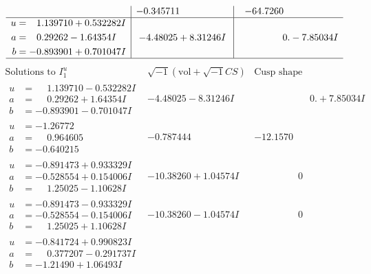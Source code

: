 \documentclass[1p]{elsarticle_modified}
\theoremstyle{definition}
\newcommand{\I}{\sqrt{-1}}
\begin{document}
$$\begin{array}{c|c|c}
 & -0.345711\phantom{ +0.000000I} & -64.7260\phantom{ +0.000000I} \\ \hline\begin{aligned}
u &= \phantom{-}1.139710 + 0.532282 I \\
a &= \phantom{-}0.29262 - 1.64354 I \\
b &= -0.893901 + 0.701047 I\end{aligned}
 & -4.48025 + 8.31246 I & \phantom{-0.000000 } 0. - 7.85034 I\\
 \hline 
 \end{array}$$\newpage$$\begin{array}{c|c|c}  
\text{Solutions to }I^u_{1}& \I (\text{vol} + \sqrt{-1}CS) & \text{Cusp shape}\\
 \hline 
\begin{aligned}
u &= \phantom{-}1.139710 - 0.532282 I \\
a &= \phantom{-}0.29262 + 1.64354 I \\
b &= -0.893901 - 0.701047 I\end{aligned}
 & -4.48025 - 8.31246 I & \phantom{-0.000000 -}0. + 7.85034 I \\ \hline\begin{aligned}
u &= -1.26772\phantom{ +0.000000I} \\
a &= \phantom{-}0.964605\phantom{ +0.000000I} \\
b &= -0.640215\phantom{ +0.000000I}\end{aligned}
 & -0.787444\phantom{ +0.000000I} & -12.1570\phantom{ +0.000000I} \\ \hline\begin{aligned}
u &= -0.891473 + 0.933329 I \\
a &= -0.528554 + 0.154006 I \\
b &= \phantom{-}1.25025 - 1.10628 I\end{aligned}
 & -10.38260 + 1.04574 I & \phantom{-0.000000 } 0 \\ \hline\begin{aligned}
u &= -0.891473 - 0.933329 I \\
a &= -0.528554 - 0.154006 I \\
b &= \phantom{-}1.25025 + 1.10628 I\end{aligned}
 & -10.38260 - 1.04574 I & \phantom{-0.000000 } 0 \\ \hline\begin{aligned}
u &= -0.841724 + 0.990823 I \\
a &= \phantom{-}0.377207 - 0.291737 I \\
b &= -1.21490 + 1.06493 I\end{aligned}

\end{array}$$
\end{document}
